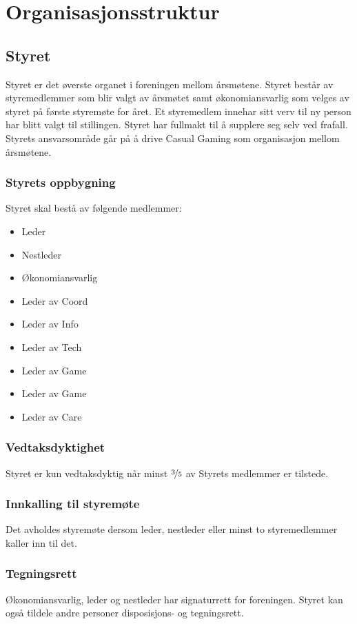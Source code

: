\chapter{Organisasjonsstruktur}

\section{Styret}
Styret er det øverste organet i foreningen mellom årsmøtene. Styret består av styremedlemmer som blir valgt av årsmøtet samt økonomiansvarlig som velges av styret på første styremøte for året. Et styremedlem innehar sitt verv til ny person har blitt valgt til stillingen. Styret har fullmakt til å supplere seg selv ved frafall. Styrets ansvarsområde går på å drive Casual Gaming som organisasjon mellom årsmøtene.

\subsection{Styrets oppbygning}
Styret skal bestå av følgende medlemmer:
\begin{itemize}
    \item Leder
    \item Nestleder
    \item Økonomiansvarlig
    \item Leder av Coord
    \item Leder av Info
    \item Leder av Tech
    \item Leder av Game
    \item Leder av Game
    \item Leder av Care
\end{itemize}

\subsection{Vedtaksdyktighet}
Styret er kun vedtaksdyktig når minst $\nicefrac{3}{5}$ av Styrets medlemmer er tilstede.

\subsection{Innkalling til styremøte}
Det avholdes styremøte dersom leder, nestleder eller minst to styremedlemmer kaller inn til det.

\subsection{Tegningsrett}
Økonomiansvarlig, leder og nestleder har signaturrett for foreningen. Styret kan også tildele andre personer disposisjons- og tegningsrett.

